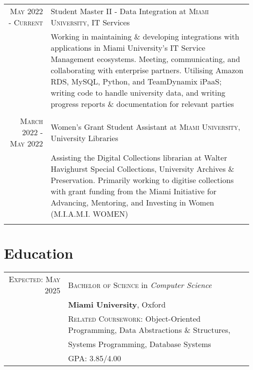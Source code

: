 \documentclass[a4paper,10pt]{article} %
\begin{document}
\begin{tabular}{r|p{11cm}}
\textsc{May 2022 - Current} & Student Master II - Data Integration at \textsc{Miami University}, IT Services \emph{}\\
& \footnotesize{Working in maintaining \& developing integrations with applications in Miami University's IT Service Management ecosystems. Meeting, communicating, and collaborating with enterprise partners.
Utilising Amazon RDS, MySQL, Python, and TeamDynamix iPaaS; writing code to handle university data, and writing progress reports \& documentation for relevant parties}\\
\multicolumn{2}{c}{} \\


\textsc{March 2022 - May 2022} & Women's Grant Student Assistant at \textsc{Miami University}, University Libraries \emph{}\\
& \footnotesize{Assisting the Digital Collections librarian at Walter Havighurst Special Collections, University Archives \& Preservation.
Primarily working to digitise collections with grant funding from the Miami Initiative for Advancing, Mentoring, and Investing in Women (M.I.A.M.I. WOMEN)}\\
\multicolumn{2}{c}{} \\
\end{tabular}\normalsize


\section{Education}

\begin{tabular}{rl}	
\textsc{Expected: May 2025} & \textsc{Bachelor of Science} in \emph{Computer Science}\\ &
\textbf{Miami University}, Oxford\\ &
\footnotesize \textsc{Related Coursework:} Object-Oriented Programming, Data Abstractions \& Structures,\\&
\footnotesize Systems Programming, Database Systems \\
&\footnotesize \textsc{GPA}: 3.85/4.00\normalsize \\


\end{tabular}
\end{document}
